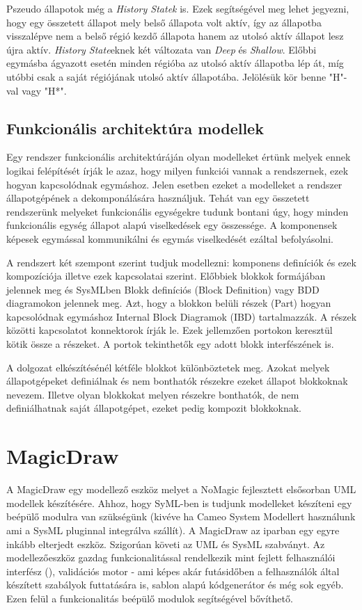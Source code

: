 Pszeudo állapotok még a \emph{History Statek} is. Ezek segítségével meg lehet jegyezni, hogy egy összetett állapot mely belső állapota volt aktív, így az állapotba visszalépve nem a belső régió kezdő állapota hanem az utolsó aktív állapot lesz újra aktív. \emph{History State}eknek két változata van \emph{Deep} és \emph{Shallow}. Előbbi egymásba ágyazott esetén minden régióba az utolsó aktív állapotba lép át, míg utóbbi csak a saját régiójának utolsó aktív állapotába. Jelölésük kör benne "H"-val vagy "H*".


\subsection{Funkcionális architektúra modellek}

Egy rendszer funkcionális architektúráján olyan modelleket értünk melyek ennek logikai felépítését írják le azaz, hogy milyen funkciói vannak a rendszernek, ezek hogyan kapcsolódnak egymáshoz. Jelen esetben ezeket a modelleket a rendszer állapotgépének a dekomponálására használjuk. Tehát van egy összetett rendszerünk melyeket funkcionális egységekre tudunk bontani úgy, hogy minden funkcionális egység állapot alapú viselkedések egy összessége. A komponensek képesek egymással kommunikálni és egymás viselkedését ezáltal befolyásolni.

A rendszert két szempont szerint tudjuk modellezni: komponens definíciók és ezek kompozíciója illetve ezek kapcsolatai szerint. Előbbiek blokkok formájában jelennek meg és SysMLben Blokk definíciós (Block Definition) vagy BDD diagramokon jelennek meg. Azt, hogy a blokkon belüli részek (Part) hogyan kapcsolódnak egymáshoz Internal Block Diagramok (IBD) tartalmazzák. A részek közötti kapcsolatot konnektorok írják le. Ezek jellemzően portokon keresztül kötik össze a részeket. A portok tekinthetők egy adott blokk interfészének is.

A dolgozat elkészítésénél kétféle blokkot különböztetek meg. Azokat melyek állapotgépeket definiálnak és nem bonthatók részekre ezeket állapot blokkoknak nevezem. Illetve olyan blokkokat melyen részekre bonthatók, de nem definiálhatnak saját állapotgépet, ezeket pedig kompozit blokkoknak.

\section{MagicDraw}

A MagicDraw egy modellező eszköz melyet a NoMagic fejlesztett elsősorban UML modellek készítésére. Ahhoz, hogy SyML-ben is tudjunk modelleket készíteni egy beépülő modulra van szükségünk (kivéve ha Cameo System Modellert használunk ami a SysML pluginnal integrálva szállít). A MagicDraw az iparban egy egyre inkább elterjedt eszköz. Szigorúan követi az UML és SysML szabványt.
Az modellezőeszköz gazdag funkcionalitással rendelkezik mint fejlett felhasználói interfész (), validációs motor - ami képes akár futásidőben a felhasználók által készített szabályok futtatására is, sablon alapú kódgenerátor és még sok egyéb. Ezen felül a funkcionalitás beépülő modulok segítségével bővíthető.

